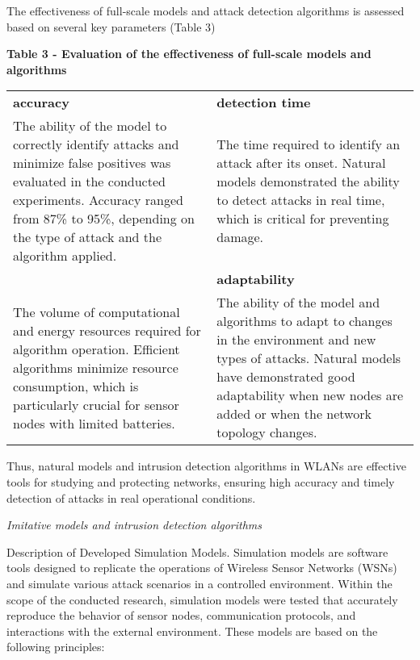 The effectiveness of full-scale models and attack detection algorithms
is assessed based on several key parameters (Table 3)

{\bfseries Table 3 - Evaluation of the effectiveness of full-scale models
and algorithms}

\begin{longtable}[]{@{}
  >{\raggedright\arraybackslash}p{}
  >{\raggedright\arraybackslash}p{}@{}}
\toprule\noalign{}
\endhead
\bottomrule\noalign{}
\endlastfoot
{\bfseries accuracy} & {\bfseries detection time} \\
The ability of the model to correctly identify attacks and minimize
false positives was evaluated in the conducted experiments. Accuracy
ranged from 87\% to 95\%, depending on the type of attack and the
algorithm applied. & The time required to identify an attack after its
onset. Natural models demonstrated the ability to detect attacks in real
time, which is critical for preventing damage. \\
{\bfseries resource consumption} & {\bfseries adaptability} \\
The volume of computational and energy resources required for algorithm
operation. Efficient algorithms minimize resource consumption, which is
particularly crucial for sensor nodes with limited batteries. & The
ability of the model and algorithms to adapt to changes in the
environment and new types of attacks. Natural models have demonstrated
good adaptability when new nodes are added or when the network topology
changes. \\
\end{longtable}

Thus, natural models and intrusion detection algorithms in WLANs are
effective tools for studying and protecting networks, ensuring high
accuracy and timely detection of attacks in real operational conditions.

\emph{Imitative models and intrusion detection algorithms}

Description of Developed Simulation Models. Simulation models are
software tools designed to replicate the operations of Wireless Sensor
Networks (WSNs) and simulate various attack scenarios in a controlled
environment. Within the scope of the conducted research, simulation
models were tested that accurately reproduce the behavior of sensor
nodes, communication protocols, and interactions with the external
environment. These models are based on the following principles:

